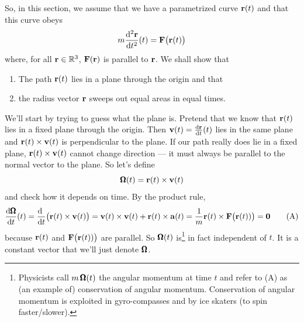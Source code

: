 So, in this section, we assume that we have a parametrized
curve $\mathbf{r}(t)$ and that this curve obeys
\begin{equation*}
m\difftwo{\vr}{t}(t) = \vF\big(\vr(t)\big)
\end{equation*}
where, for all $\mathbf{r}\in\mathbb{R}^3$, $\mathbf{F}(\mathbf{r})$ is parallel to $\mathbf{r}$. We shall show that
\begin{enumerate}\itemsep1pt \parskip0pt  %
\item 
The path $\mathbf{r}(t)$ lies in a plane through the origin and that
\item
the radius vector $\mathbf{r}$ sweeps out equal areas in equal times. 
\end{enumerate}
We'll start by trying to guess what the plane is. Pretend that we know that 
$\mathbf{r}(t)$ lies in a fixed plane through the origin. Then 
$\vv(t)=\diff{\vr}{t}(t)$ lies in the same plane and 
$\mathbf{r}(t)\times\mathbf{v}(t)$ is perpendicular to the plane. If our path really does
lie in a fixed plane, $\mathbf{r}(t)\times\mathbf{v}(t)$ cannot change direction --- it must 
always be parallel to the normal vector to the plane. So let's define
\begin{equation*}
\pmb{\Omega}(t) = \mathbf{r}(t)\times\mathbf{v}(t)
\end{equation*}
and check how it depends on time. By the product rule,
\begin{equation}
\diff{\vOm}{t}(t) =\diff{\ }{t}\big(\vr(t)\times\vv(t)\big)
=\vv(t)\times\vv(t) + \vr(t)\times\va(t)
=\frac{1}{m}\vr(t)\times\vF\big(\vr(t))\big)
=\vZero
\tag{A}\end{equation}
because $\mathbf{r}(t)$ and $\mathbf{F}\big(\mathbf{r}(t))\big)$ are parallel.
So $\pmb{\Omega}(t)$ is\footnote{Physicists call $m\,\pmb{\Omega}(t)$ the angular momentum at time $t$ and refer to (A) as (an example of) conservation of angular momentum.
Conservation of angular momentum is exploited in gyro-compasses and by 
ice skaters (to spin faster/slower).} 
in fact independent of $t$. It is a constant vector that
we'll just denote $\pmb{\Omega}$. 

